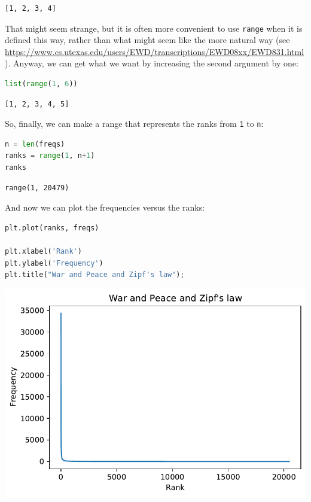 \begin{lstlisting}[]
[1, 2, 3, 4]
\end{lstlisting}

That might seem strange, but it is often more convenient to use
\passthrough{\lstinline!range!} when it is defined this way, rather than
what might seem like the more natural way (see
\url{https://www.cs.utexas.edu/users/EWD/transcriptions/EWD08xx/EWD831.html}).
Anyway, we can get what we want by increasing the second argument by
one:

\begin{lstlisting}[language=Python]
list(range(1, 6))
\end{lstlisting}

\begin{lstlisting}[]
[1, 2, 3, 4, 5]
\end{lstlisting}

So, finally, we can make a range that represents the ranks from
\passthrough{\lstinline!1!} to \passthrough{\lstinline!n!}:

\begin{lstlisting}[language=Python]
n = len(freqs)
ranks = range(1, n+1)
ranks
\end{lstlisting}

\begin{lstlisting}[]
range(1, 20479)
\end{lstlisting}

And now we can plot the frequencies versus the ranks:

\begin{lstlisting}[language=Python]
plt.plot(ranks, freqs)

plt.xlabel('Rank')
plt.ylabel('Frequency')
plt.title("War and Peace and Zipf's law");
\end{lstlisting}

\begin{center}
\includegraphics[scale=0.75]{chapters/06_plotting_files/06_plotting_75_0.pdf}
\end{center}

